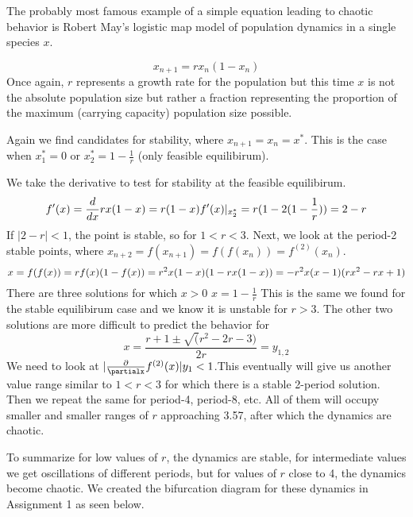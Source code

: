 \documentclass[
]{article}
\begin{document}
The probably most famous example of a simple equation leading to chaotic
behavior is Robert May's logistic map model of population dynamics in a
single species \(x\).

\[
x_{n+1}=rx_n(1-x_n)
\] Once again, \(r\) represents a growth rate for the population but
this time \(x\) is not the absolute population size but rather a
fraction representing the proportion of the maximum (carrying capacity)
population size possible.

Again we find candidates for stability, where \(x_{n+1}=x_n=x^*\). This
is the case when \(x^*_1=0\) or \(x^*_2=1-\frac{1}{r}\) (only feasible
equilibirum).

We take the derivative to test for stability at the feasible
equilibirum. \[
f'(x)=\frac{d}{dx}rx(1-x)=r(1-x)\\
f'(x)|_{x^*_2}=r(1-2(1-\frac{1}{r}))=2-r
\] If \(|2-r|<1\), the point is stable, so for \(1<r<3\). Next, we look
at the period-2 stable points, where
\(x_{n+2}=f(x_{n+1})=f(f(x_n))=f^{(2)}(x_n)\). \[ 
x= f(f(x))= rf(x)(1-f(x))\\=r^2x(1-x)(1-rx(1-x))\\=-r^2x(x-1)(rx^2-rx+1)
\] There are three solutions for which \(x>0\) \(x=1-\frac{1}{r}\) This
is the same we found for the stable equilibirum case and we know it is
unstable for \(r>3\). The other two solutions are more difficult to
predict the behavior for \[
x=\frac{r+1\pm\sqrt(r^2-2r-3)}{2r}=y_{1,2}
\] We need to look at
\(|\frac{\partial}{\partialx}f^{(2)}(x)|y_1<1\).This eventually will
give us another value range similar to \(1<r<3\) for which there is a
stable 2-period solution. Then we repeat the same for period-4,
period-8, etc. All of them will occupy smaller and smaller ranges of
\(r\) approaching 3.57, after which the dynamics are chaotic.

To summarize for low values of \(r\), the dynamics are stable, for
intermediate values we get oscillations of different periods, but for
values of \(r\) close to 4, the dynamics become chaotic. We created the
bifurcation diagram for these dynamics in Assignment 1 as seen below.
\end{document}
